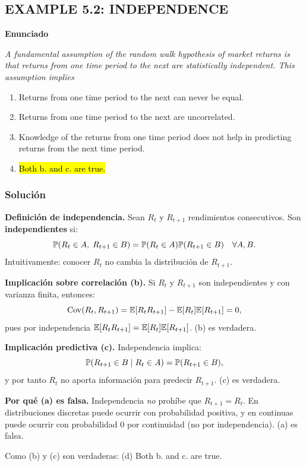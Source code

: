 ﻿\subsection{EXAMPLE 5.2: INDEPENDENCE}

\textbf{Enunciado}

\emph{A fundamental assumption of the random walk hypothesis of market
returns is that returns from one time period to the next are statistically
independent. This assumption implies}
\begin{enumerate}[label=\alph*.]
\item Returns from one time period to the next can never be equal.
\item Returns from one time period to the next are uncorrelated.
\item Knowledge of the returns from one time period does not help in
predicting returns from the next time period.
\item \hl{Both b. and c. are true.}
\end{enumerate}

\subsubsection*{Solución}


\textbf{Definición de independencia. }Sean \(R_t\) y \(R_{t+1}\) rendimientos consecutivos. Son \textbf{independientes} si:
\[
\mathbb{P}(R_t\in A,\;R_{t+1}\in B)=\mathbb{P}(R_t\in A)\mathbb{P}(R_{t+1}\in B)
\quad \forall A,B.
\]
Intuitivamente: conocer \(R_t\) no cambia la distribución de \(R_{t+1}\).

\textbf{Implicación sobre correlación (b). }Si \(R_t\) y \(R_{t+1}\) son independientes y con varianza finita, entonces:
\[
\mathrm{Cov}(R_t,R_{t+1})
=\mathbb{E}[R_tR_{t+1}]-\mathbb{E}[R_t]\mathbb{E}[R_{t+1}]
=0,
\]
pues por independencia \(\mathbb{E}[R_tR_{t+1}]=\mathbb{E}[R_t]\mathbb{E}[R_{t+1}]\).
(b) es verdadera.

\textbf{Implicación predictiva (c). }Independencia implica:
\[
\mathbb{P}(R_{t+1}\in B\mid R_t\in A)=\mathbb{P}(R_{t+1}\in B),
\]
y por tanto \(R_t\) no aporta información para predecir \(R_{t+1}\).
(c) es verdadera.

\textbf{Por qué (a) es falsa.} Independencia \emph{no} prohíbe que \(R_{t+1}=R_t\). En distribuciones discretas puede ocurrir con probabilidad positiva, y en continuas puede ocurrir con probabilidad 0 por continuidad (no por independencia).
(a) es falsa.


Como (b) y (c) son verdaderas:
(d) Both b. and c. are true.












